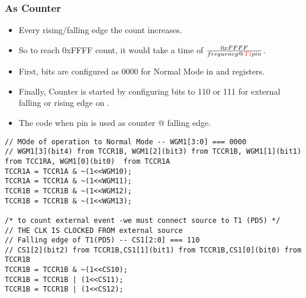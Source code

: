 \subsubsection{As Counter}
\begin{itemize}
    \item Every rising/falling edge the count increases.
    \item So to reach 0xFFFF count, it would take a time of $\frac{0xFFFF}{frequency @ \emph{\textcolor{red}{T1}} pin}$.
    \item First,  bits are configured as 0000 for Normal Mode in  and  registers.
    \item Finally, Counter is started by configuring  bits to 110 or 111 for external falling or rising edge on .
    \item The code when  pin is used as counter @ falling edge.
\end{itemize}
\begin{verbatim}
// MOde of operation to Normal Mode -- WGM1[3:0] === 0000
// WGM1[3](bit4) from TCCR1B, WGM1[2](bit3) from TCCR1B, WGM1[1](bit1)  from TCC1RA, WGM1[0](bit0)  from TCCR1A	
TCCR1A = TCCR1A & ~(1<<WGM10);
TCCR1A = TCCR1A & ~(1<<WGM11);
TCCR1B = TCCR1B & ~(1<<WGM12);
TCCR1B = TCCR1B & ~(1<<WGM13);
    
/* to count external event -we must connect source to T1 (PD5) */
// THE CLK IS CLOCKED FROM external source
// Falling edge of T1(PD5) -- CS1[2:0] === 110
// CS1[2](bit2) from TCCR1B,CS1[1](bit1) from TCCR1B,CS1[0](bit0) from TCCR1B
TCCR1B = TCCR1B & ~(1<<CS10);
TCCR1B = TCCR1B | (1<<CS11);
TCCR1B = TCCR1B | (1<<CS12);
\end{verbatim}

